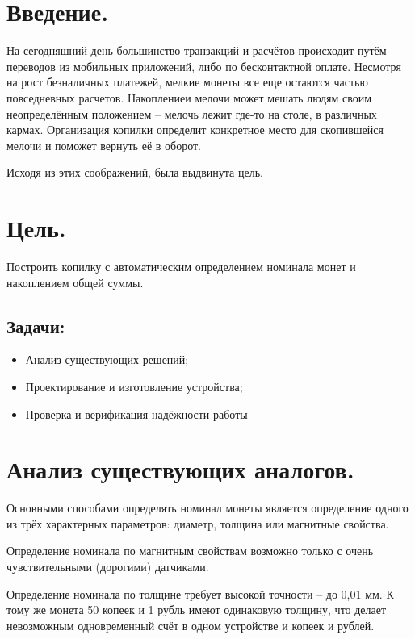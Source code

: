 \section {Введение.}

На сегодняшний день большинство транзакций и расчётов происходит путём переводов из мобильных приложений, либо по бесконтактной оплате. Несмотря на рост безналичных платежей, мелкие монеты все еще остаются частью повседневных расчетов. Накоплениеи мелочи может мешать людям своим неопределённым положением -- мелочь лежит где-то на столе, в различных кармах. Организация копилки определит конкретное место для скопившейся мелочи и поможет вернуть её в оборот.
\par\medskip

Исходя из этих соображений, была выдвинута цель.

\section{Цель.}

Построить копилку с автоматическим определением номинала монет и накоплением общей суммы.

\subsection*{Задачи:}
\begin{itemize}
	\item Анализ существующих решений;
	\item Проектирование и изготовление устройства;
	\item Проверка и верификация надёжности работы
\end{itemize}

\section {Анализ существующих аналогов.}

Основными способами определять номинал монеты является определение одного из трёх характерных параметров: диаметр, толщина или магнитные свойства. 
\par\medskip

Определение номинала по магнитным свойствам возможно только с очень чувствительными (дорогими) датчиками.
\par\medskip

Определение номинала по толщине требует высокой точности -- до 0,01 мм. К тому же монета 50 копеек и 1 рубль имеют одинаковую толщину, что делает невозможным одновременный счёт в одном устройстве и копеек и рублей.
\par\medskip

